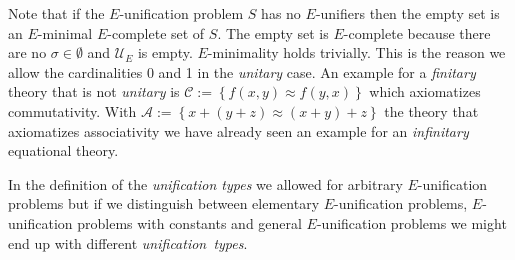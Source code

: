 Note that if the $E$-unification problem $S$ has no $E$-unifiers then the empty set is an $E$-minimal $E$-complete set of $S$. The empty set is $E$-complete because there are no $\sigma\in\emptyset$ and $\mathcal{U}_E$ is empty. $E$-minimality holds trivially. This is the reason we allow the cardinalities 0 and 1 in the \emph{unitary} case.
An example for a \emph{finitary} theory that is not \emph{unitary} is $\mathcal{C}:=\left\lbrace f(x,y)\approx f(y,x)\right\rbrace$ which axiomatizes commutativity.
With $\mathcal{A}:=\left\lbrace x+(y+z)\approx (x+y)+z\right\rbrace$ the theory that axiomatizes associativity we have already seen an example for an \emph{infinitary} equational theory.

In the definition of the \emph{unification types} we allowed for arbitrary $E$-unification problems but if we distinguish between elementary $E$-unification problems, $E$-unification problems with constants and general $E$-unification problems we might end up with different \emph{unification\ types}.